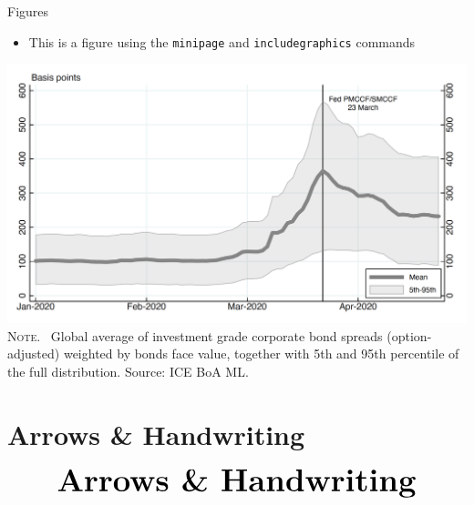 \documentclass[10pt]{beamer}
\begin{document}
\begin{frame}
	{Figures}
	\begin{itemize}
		\item This is a figure using the \texttt{minipage} and \texttt{includegraphics} commands
	\end{itemize}
	\begin{center}
		\begin{minipage}[b]{.6\textwidth}
			\includegraphics[width=\textwidth]{figure}\\
			\tiny{{\scshape Note}. \ Global average of investment grade corporate bond spreads (option-adjusted) weighted by bonds face value, together with 5th and 95th percentile of the full distribution. Source: ICE BoA ML.}
		\end{minipage}
	\end{center}
\end{frame}


\section{Arrows \& Handwriting}
\begin{frame}
	\begin{eqnarray*}
		&\text{{\Huge \textbf{Arrows \& Handwriting}}}\\
	\end{eqnarray*}
\end{frame}

\end{document}

